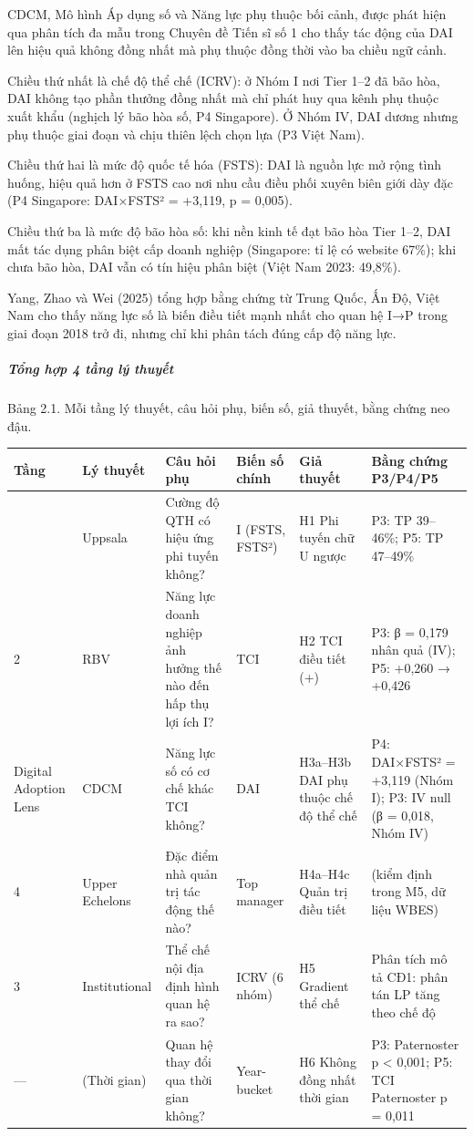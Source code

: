 \documentclass[12pt,a4paper]{article}
\begin{document}
CDCM, Mô hình Áp dụng số và Năng lực phụ thuộc bối cảnh, được phát hiện
qua phân tích đa mẫu trong Chuyên đề Tiến sĩ số 1 cho thấy tác động của
DAI lên hiệu quả không đồng nhất mà phụ thuộc đồng thời vào ba chiều ngữ
cảnh.

Chiều thứ nhất là chế độ thể chế (ICRV): ở Nhóm I nơi Tier 1--2 đã bão
hòa, DAI không tạo phần thưởng đồng nhất mà chỉ phát huy qua kênh phụ
thuộc xuất khẩu (nghịch lý bão hòa số, P4 Singapore). Ở Nhóm IV, DAI
dương nhưng phụ thuộc giai đoạn và chịu thiên lệch chọn lựa (P3 Việt
Nam).

Chiều thứ hai là mức độ quốc tế hóa (FSTS): DAI là nguồn lực mở rộng
tình huống, hiệu quả hơn ở FSTS cao nơi nhu cầu điều phối xuyên biên
giới dày đặc (P4 Singapore: DAI×FSTS² = +3,119, p = 0,005).

Chiều thứ ba là mức độ bão hòa số: khi nền kinh tế đạt bão hòa Tier
1--2, DAI mất tác dụng phân biệt cấp doanh nghiệp (Singapore: tỉ lệ có
website 67\%); khi chưa bão hòa, DAI vẫn có tín hiệu phân biệt (Việt Nam
2023: 49,8\%).

Yang, Zhao và Wei (2025) tổng hợp bằng chứng từ Trung Quốc, Ấn Độ, Việt
Nam cho thấy năng lực số là biến điều tiết mạnh nhất cho quan hệ I→P
trong giai đoạn 2018 trở đi, nhưng chỉ khi phân tách đúng cấp độ năng
lực.

\hypertarget{tux1ed5ng-hux1ee3p-4-tux1ea7ng-luxfd-thuyux1ebft}{%
\subparagraph{Tổng hợp 4 tầng lý
thuyết}\label{tux1ed5ng-hux1ee3p-4-tux1ea7ng-luxfd-thuyux1ebft}}

Bảng 2.1. Mỗi tầng lý thuyết, câu hỏi phụ, biến số, giả thuyết, bằng
chứng neo đậu.

\begin{longtable}[]{@{}llllll@{}}
\toprule\noalign{}
Tầng & Lý thuyết & Câu hỏi phụ & Biến số chính & Giả thuyết & Bằng chứng
P3/P4/P5 \\
\midrule\noalign{}
\endhead
\bottomrule\noalign{}
\endlastfoot
1 & Uppsala & Cường độ QTH có hiệu ứng phi tuyến không? & I (FSTS,
FSTS²) & H1 Phi tuyến chữ U ngược & P3: TP 39--46\%; P5: TP 47--49\% \\
2 & RBV & Năng lực doanh nghiệp ảnh hưởng thế nào đến hấp thụ lợi ích I?
& TCI & H2 TCI điều tiết (+) & P3: β = 0,179 nhân quả (IV); P5: +0,260 →
+0,426 \\
Digital Adoption Lens & CDCM & Năng lực số có cơ chế khác TCI không? &
DAI & H3a--H3b DAI phụ thuộc chế độ thể chế & P4: DAI×FSTS² = +3,119
(Nhóm I); P3: IV null (β = 0,018, Nhóm IV) \\
4 & Upper Echelons & Đặc điểm nhà quản trị tác động thế nào? & Top
manager & H4a--H4c Quản trị điều tiết & (kiểm định trong M5, dữ liệu
WBES) \\
3 & Institutional & Thể chế nội địa định hình quan hệ ra sao? & ICRV (6
nhóm) & H5 Gradient thể chế & Phân tích mô tả CĐ1: phân tán LP tăng theo
chế độ \\
--- & (Thời gian) & Quan hệ thay đổi qua thời gian không? & Year-bucket
& H6 Không đồng nhất thời gian & P3: Paternoster p \textless{} 0,001;
P5: TCI Paternoster p = 0,011 \\
\end{longtable}
\end{document}
